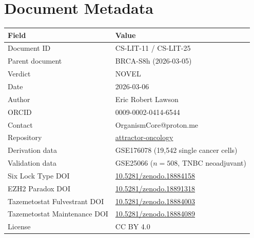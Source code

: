 \documentclass[12pt, a4paper]{article}
\begin{document}
\section{Document Metadata}

\begin{tabular}{ll}
\toprule
\textbf{Field} & \textbf{Value} \\
\midrule
Document ID & CS-LIT-11 / CS-LIT-25 \\
Parent document & BRCA-S8h (2026-03-05) \\
Verdict & NOVEL \\
Date & 2026-03-06 \\
Author & Eric Robert Lawson \\
ORCID & 0009-0002-0414-6544 \\
Contact & OrganismCore@proton.me \\
Repository &
\href{https://github.com/Eric-Robert-Lawson/attractor-oncology}
{attractor-oncology} \\
Derivation data & GSE176078 (19,542 single cancer cells) \\
Validation data & GSE25066 ($n=508$, TNBC neoadjuvant) \\
Six Lock Type DOI &
\href{https://doi.org/10.5281/zenodo.18884158}
{10.5281/zenodo.18884158} \\
EZH2 Paradox DOI &
\href{https://doi.org/10.5281/zenodo.18891318}
{10.5281/zenodo.18891318} \\
Tazemetostat Fulvestrant DOI &
\href{https://doi.org/10.5281/zenodo.18884003}
{10.5281/zenodo.18884003} \\
Tazemetostat Maintenance DOI &
\href{https://doi.org/10.5281/zenodo.18884089}
{10.5281/zenodo.18884089} \\
License & CC BY 4.0 \\
\bottomrule
\end{tabular}
\end{document}
